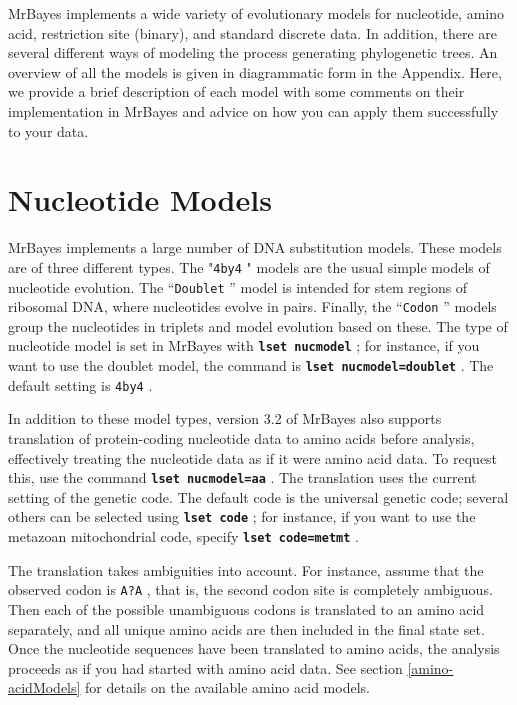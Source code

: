 \documentclass[12pt]{book}
\newcommand{\ttt}[1]{\texttt{#1} }
\newcommand{\tb}[1]{\texttt{\textbf{#1}} }
\begin{document}
MrBayes implements a wide variety of evolutionary models for nucleotide, amino acid,
restriction site (binary), and standard discrete data. In addition, there are several different
ways of modeling the process generating phylogenetic trees. An overview of all the
models is given in diagrammatic form in the Appendix. Here, we provide a brief
description of each model with some comments on their implementation in MrBayes and
advice on how you can apply them successfully to your data.

\section{Nucleotide Models}
MrBayes implements a large number of DNA substitution models. These models are of
three different types. The "\ttt{4by4}" models are the usual simple models of nucleotide
evolution. The ``\ttt{Doublet}'' model is intended for stem regions of ribosomal DNA, where
nucleotides evolve in pairs. Finally, the ``\ttt{Codon}'' models group the nucleotides in triplets
and model evolution based on these. The type of nucleotide model is set in MrBayes with
\tb{lset nucmodel}; for instance, if you want to use the doublet model, the command is
\tb{lset nucmodel=doublet}. The default setting is \ttt{4by4}.

In addition to these model types, version 3.2 of MrBayes also supports translation of protein-coding
nucleotide data to amino acids before analysis, effectively treating the nucleotide data as if it
were amino acid data. To request this, use the command \tb{lset nucmodel=aa}. The translation
uses the current setting of the genetic code. The default code is the universal genetic code; several
others can be selected using \tb{lset code}; for instance, if you want to use the metazoan mitochondrial
code, specify \tb{lset code=metmt}.

The translation takes ambiguities into account. For instance, assume that the observed codon is
\ttt{A?A}, that is, the second codon site is completely ambiguous. Then each of the possible
unambiguous codons is translated to an amino acid separately, and all unique amino acids are
then included in the final state set. Once the nucleotide sequences have
been translated to amino acids, the analysis proceeds as if you had started with amino acid data.
See section \ref{amino-acidModels} for details on the available amino acid models.
\end{document}
